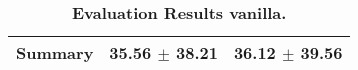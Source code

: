 \begin{table}[htb]
{\begin{tabular}{lll}
\midrule
\textbf{Summary                                  } &                  \phantom{0}35.56 $\pm$ 38.21 &                      \phantom{0}36.12 $\pm$ 39.56 \\
\bottomrule
\end{tabular}%
}
\caption{\textbf{Evaluation Results vanilla.}}
\label{tab:eval-results}
\end{table}
